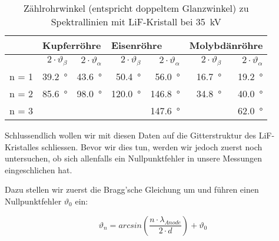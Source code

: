 \begin{table}[h!]
    \centering
    \small
    \caption{%
        Z\"ahlrohrwinkel (entspricht doppeltem  Glanzwinkel) zu Spektrallinien
        mit LiF-Kristall bei \SI{35}{\kilo\volt}
    }
    \label{tab:spektra:LiF}
    \begin{tabular}{lrrrrrr}
        \toprule
        & \multicolumn{2}{l}{Kupferr\"ohre} & \multicolumn{2}{l}{Eisenr\"ohre} & \multicolumn{2}{l}{Molybd\"anr\"ohre} \\
        \midrule

        &
        $2 \cdot \vartheta_\beta$  &
        $2 \cdot \vartheta_\alpha$ &
        $2 \cdot \vartheta_\beta$  &
        $2 \cdot \vartheta_\alpha$ &
        $2 \cdot \vartheta_\beta$  &
        $2 \cdot \vartheta_\alpha$ \\

        \midrule

        n = 1              &
        \SI{39.2}{\degree} &
        \SI{43.6}{\degree} &
        \SI{50.4}{\degree} &
        \SI{56.0}{\degree} &
        \SI{16.7}{\degree} &
        \SI{19.2}{\degree} \\

        n = 2              &
        \SI{ 85.6}{\degree} &
        \SI{ 98.0}{\degree} &
        \SI{120.0}{\degree} &
        \SI{146.8}{\degree} &
        \SI{ 34.8}{\degree} &
        \SI{ 40.0}{\degree} \\

        n = 3              &
                            &
                            &
                            &
        \SI{147.6}{\degree} &
                            &
        \SI{ 62.0}{\degree} \\


        \bottomrule
    \end{tabular}
\end{table}


Schlussendlich  wollen  wir  mit  diesen  Daten  auf  die  Gitterstruktur  des
LiF-Kristalles schliessen. Bevor wir  dies tun, werden wir  jedoch zuerst noch
untersuchen,  ob  sich  allenfalls  ein Nullpunktfehler  in  unsere  Messungen
eingeschlichen hat.

Dazu stellen wir zuerst die Bragg'sche Gleichung um und f\"uhren einen Nullpunktfehler
$\vartheta_0$ ein:

\begin{equation}
    \label{eq:braggNew}
    \vartheta_n = arcsin \left( \frac{n \cdot \lambda_{Anode}}{2 \cdot d} \right) + \vartheta_0
\end{equation}

